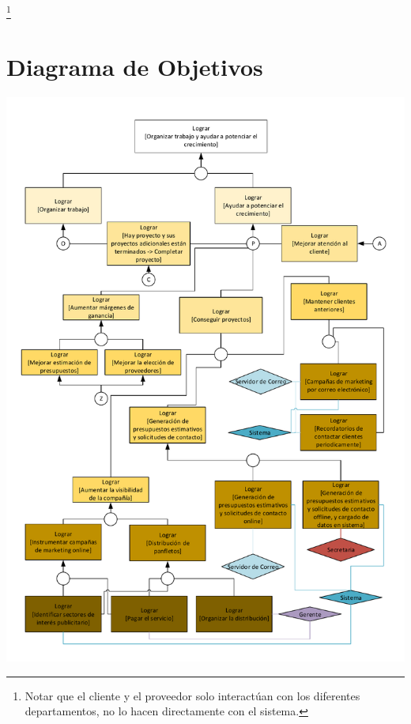\documentclass{article}
\theoremstyle{definition}
\theoremstyle{remark}
\begin{document}
\footnote{Notar que el cliente y el proveedor solo interactúan con los diferentes departamentos, no lo hacen directamente con el sistema.}

\section{Diagrama de Objetivos}

\includegraphics[width=\textwidth,height=\textheight,keepaspectratio,page=1]{images/objetivos.pdf}
\end{document}
